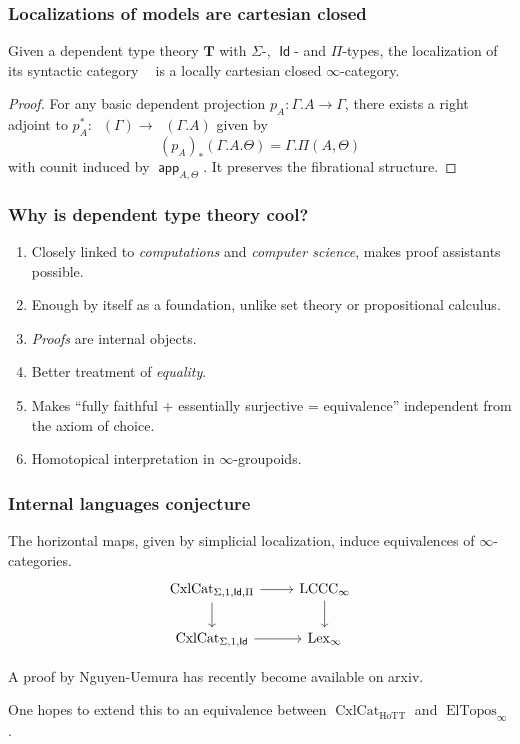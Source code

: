 \documentclass{beamer}
\DeclareMathOperator{\Id}{\mathsf{Id}}
\DeclareMathOperator{\cxl}{CxlCat}
\DeclareMathOperator{\HoTT}{HoTT}
\DeclareMathOperator{\ElTopos}{ElTopos}
\DeclareMathOperator{\lexi}{Lex_\infty}
\DeclareMathOperator{\lccci}{LCCC_\infty}
\DeclareMathOperator{\app}{\mathsf{app}}
\DeclareMathOperator{\Syn}{\mathsf{Syn}(\mathbf{T})}
\begin{document}
\begin{frame}
  \frametitle{Localizations of models are cartesian closed}

  \begin{thm}[Kapulkin 2015]
    Given a dependent type theory $\mathbf{T}$ with $\Sigma$-, $\Id$- and
    $\Pi$-types, the localization of its syntactic category $\Syn$ is a
    locally cartesian closed $\infty$-category.
  \end{thm}
  \pause

  \begin{proof}
    For any basic dependent projection $p_A\colon\Gamma.A\rightarrow\Gamma$,
    there exists a right adjoint to
    $p_A^*\colon\Syn(\Gamma)\rightarrow\Syn(\Gamma.A)$ given by
    \[(p_A)_*(\Gamma.A.\Theta)=\Gamma.\Pi(A,\Theta)\]
    with counit induced by $\app_{A,\Theta}$. It preserves the fibrational
    structure.
  \end{proof}
\end{frame}

\begin{frame}
\end{frame}

\begin{frame}
  \frametitle{Why is dependent type theory cool?}

  \begin{enumerate}
    \item Closely linked to \emph{computations} and \emph{computer science},
      makes proof assistants possible.
    \item Enough by itself as a foundation, unlike set theory or propositional
      calculus.
    \item \emph{Proofs} are internal objects.
    \item Better treatment of \emph{equality}.
    \item Makes ``fully faithful $+$ essentially surjective = equivalence''
      independent from the axiom of choice.
    \item Homotopical interpretation in $\infty$-groupoids.
  \end{enumerate}
\end{frame}

\begin{frame}
  \frametitle{Internal languages conjecture}

  \begin{conj}
    The horizontal maps, given by simplicial localization, induce
    equivalences of $\infty$-categories.
    \[\begin{tikzcd}[ampersand replacement=\&]
      {\cxl_{\Sigma,1,\Id,\Pi}} \& {\lccci} \\
      {\cxl_{\Sigma,1,\Id}} \& {\lexi}
      \arrow[from=1-1, to=2-1]
      \arrow[from=1-2, to=2-2]
      \arrow[from=2-1, to=2-2]
      \arrow[from=1-1, to=1-2]
    \end{tikzcd}\]
  \end{conj}

  A proof by Nguyen-Uemura has recently become available on arxiv.

  One hopes to extend this to an equivalence between $\cxl_{\HoTT}$ and
  $\ElTopos_\infty$.
\end{frame}
\end{document}
